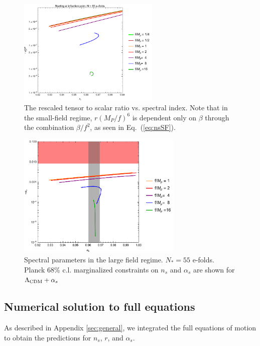 \documentclass[aps,amsfonts,amsmath,prd,preprint,nofootinbib,superscriptaddress]{revtex4}
\newcommand{\Mp}{{M_{P}}}
\begin{document}
\begin{figure}[!h]
  \centering
    \includegraphics[width=0.6\textwidth]{figures/nsrf6plotvsf.pdf}
    \caption{The rescaled tensor to scalar ratio vs. spectral index. Note that in the small-field regime, $r (\Mp/f)^6$ is dependent only on $\beta$ through the combination $\beta/f^2$, as seen in Eq.~(\ref{eq:nsSF}).}
\end{figure}




\begin{figure}[!h]
  \centering
    \includegraphics[width=0.7\textwidth]{figures/alphasvsnsplot.pdf}
    \caption{Spectral parameters in the large field regime.  $N_\ast = 55$ e-folds. Planck 68\% c.l. marginalized constraints on $n_s$ and $\alpha_s$ are shown for $\Lambda_{\rm CDM} + \alpha_s$}
\end{figure}

\subsection{Numerical solution to full equations}

As described in Appendix \ref{sec:general}, we integrated the full equations of motion to obtain the predictions for $n_s$, $r$, and $\alpha_s$.  
\end{document}

